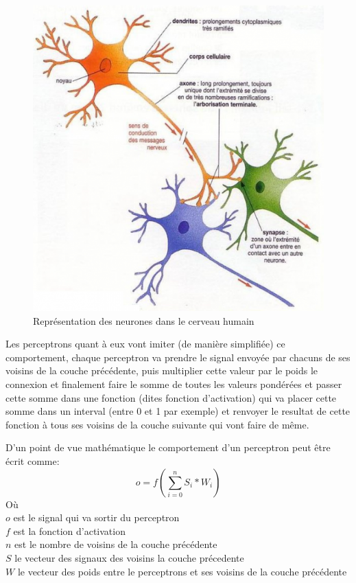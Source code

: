 \documentclass{article}
\begin{document}
\begin{figure}[h]
\begin{center}
	\includegraphics[scale=0.5]{neurones.png}
	\caption{Représentation des neurones dans le cerveau humain}
\end{center}
\end{figure}

Les perceptrons quant à eux vont imiter (de manière simplifiée) ce comportement, chaque perceptron va prendre le signal envoyée par chacuns de ses voisins de la couche précédente, puis multiplier cette valeur par le poids le connexion et finalement faire le somme de toutes les valeurs pondérées et passer cette somme dans une fonction (dites fonction d'activation) qui va placer cette somme dans un interval (entre 0 et 1 par exemple) et renvoyer le resultat de cette fonction à tous ses voisins de la couche suivante qui vont faire de même.

D'un point de vue mathématique le comportement d'un perceptron peut être écrit comme:
\begin{equation}
o = f(\sum_{i=0}^{n} S_i * W_i)
\end{equation}
Où\\
$o$ est le signal qui va sortir du perceptron\\
$f$ est la fonction d'activation\\
$n$ est le nombre de voisins de la couche précédente\\
$S$ le vecteur des signaux des voisins la couche précedente\\
$W$ le vecteur des poids entre le perceptrons et ses voisins de la couche précédente
\end{document}
